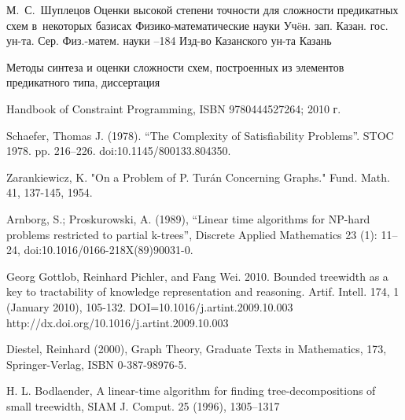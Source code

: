 \documentclass[12pt]{article}
\begin{document}
\clearpage
{}
    \by М.~С.~Шуплецов
    \paper Оценки высокой степени точности для сложности предикатных схем в~некоторых базисах
    \inbook Физико-математические науки
    \serial Уч\"eн. зап. Казан. гос. ун-та. Сер. Физ.-матем. науки
    --184
    \publ Изд-во Казанского ун-та
    \publaddr Казань

Методы синтеза и оценки сложности схем, построенных из элементов предикатного типа, диссертация

 Handbook of Constraint Programming, ISBN 9780444527264; 2010 г.

 Schaefer, Thomas J. (1978). 
``The Complexity of Satisfiability Problems''. STOC 1978. pp. 216–226. doi:10.1145/800133.804350.

 Zarankiewicz, K. "On a Problem of P. Turán Concerning Graphs." Fund. Math. 41, 137-145, 1954. 

 Arnborg, S.; Proskurowski, A. (1989), 
``Linear time algorithms for NP-hard problems restricted to partial k-trees'',
Discrete Applied Mathematics 23 (1): 11–24, doi:10.1016/0166-218X(89)90031-0.

Georg Gottlob, Reinhard Pichler, and Fang Wei. 2010. Bounded treewidth as a key to tractability of knowledge representation and reasoning. Artif. Intell. 174, 1 (January 2010), 105-132. DOI=10.1016/j.artint.2009.10.003 http://dx.doi.org/10.1016/j.artint.2009.10.003

Diestel, Reinhard (2000), Graph Theory, Graduate Texts in Mathematics, 
173, Springer-Verlag, ISBN 0-387-98976-5.

H. L. Bodlaender, A linear-time algorithm for finding 
tree-decompositions of small
treewidth, SIAM J. Comput. 25 (1996), 1305–1317


\endthebibliography
\end{document}
